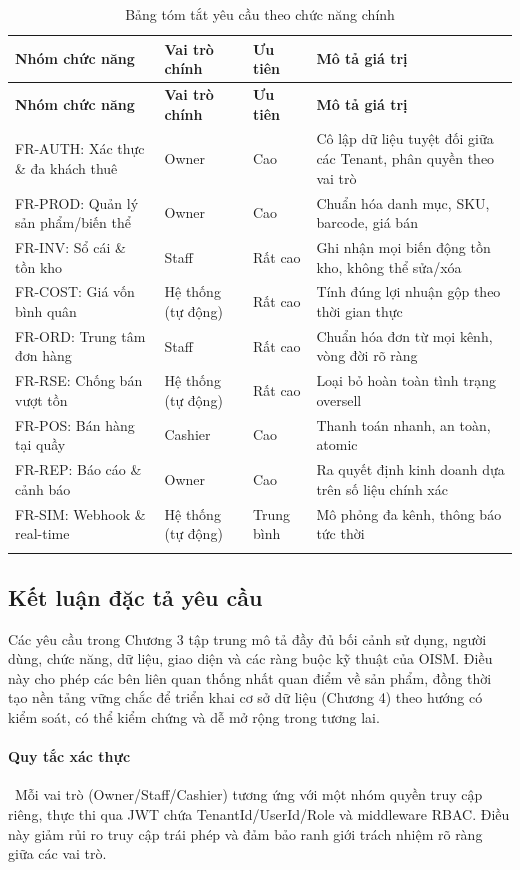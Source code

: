 \begin{longtable}{|p{2.6cm}|p{2.6cm}|p{2.2cm}|p{5.0cm}|}
\hline
\textbf{Nhóm chức năng} & \textbf{Vai trò chính} & \textbf{Ưu tiên} & \textbf{Mô tả giá trị} \\
\hline
\endfirsthead
\hline
\textbf{Nhóm chức năng} & \textbf{Vai trò chính} & \textbf{Ưu tiên} & \textbf{Mô tả giá trị} \\
\hline
\endhead
FR-AUTH: Xác thực \& đa khách thuê & Owner & Cao & Cô lập dữ liệu tuyệt đối giữa các Tenant, phân quyền theo vai trò \\
\hline
FR-PROD: Quản lý sản phẩm/biến thể & Owner & Cao & Chuẩn hóa danh mục, SKU, barcode, giá bán \\
\hline
FR-INV: Sổ cái \& tồn kho & Staff & Rất cao & Ghi nhận mọi biến động tồn kho, không thể sửa/xóa \\
\hline
FR-COST: Giá vốn bình quân & Hệ thống (tự động) & Rất cao & Tính đúng lợi nhuận gộp theo thời gian thực \\
\hline
FR-ORD: Trung tâm đơn hàng & Staff & Rất cao & Chuẩn hóa đơn từ mọi kênh, vòng đời rõ ràng \\
\hline
FR-RSE: Chống bán vượt tồn & Hệ thống (tự động) & Rất cao & Loại bỏ hoàn toàn tình trạng oversell \\
\hline
FR-POS: Bán hàng tại quầy & Cashier & Cao & Thanh toán nhanh, an toàn, atomic \\
\hline
FR-REP: Báo cáo \& cảnh báo & Owner & Cao & Ra quyết định kinh doanh dựa trên số liệu chính xác \\
\hline
FR-SIM: Webhook \& real-time & Hệ thống (tự động) & Trung bình & Mô phỏng đa kênh, thông báo tức thời \\
\hline
\caption{Bảng tóm tắt yêu cầu theo chức năng chính}
\end{longtable}

\subsection{Kết luận đặc tả yêu cầu}

Các yêu cầu trong Chương 3 tập trung mô tả đầy đủ bối cảnh sử dụng, người dùng, chức năng, dữ liệu, giao diện và các ràng buộc kỹ thuật của OISM. Điều này cho phép các bên liên quan thống nhất quan điểm về sản phẩm, đồng thời tạo nền tảng vững chắc để triển khai cơ sở dữ liệu (Chương 4) theo hướng có kiểm soát, có thể kiểm chứng và dễ mở rộng trong tương lai.

\paragraph*{Quy tắc xác thực}\
Mỗi vai trò (Owner/Staff/Cashier) tương ứng với một nhóm quyền truy cập riêng, thực thi qua JWT chứa TenantId/UserId/Role và middleware RBAC. Điều này giảm rủi ro truy cập trái phép và đảm bảo ranh giới trách nhiệm rõ ràng giữa các vai trò.

